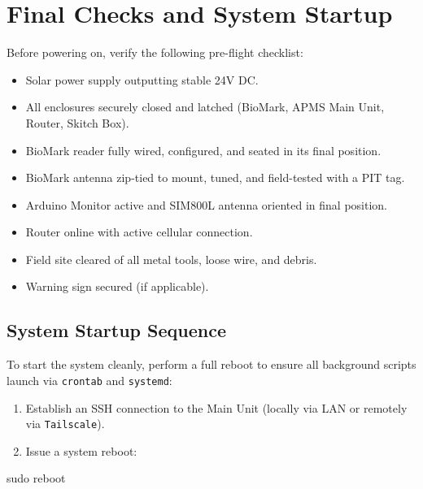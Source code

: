 \documentclass[
  letterpaper,
]{scrbook}
\newenvironment{Shaded}{\begin{snugshade}}{\end{snugshade}}
\newcommand{\FunctionTok}[1]{\textcolor[rgb]{0.28,0.35,0.67}{#1}}
\newcommand{\NormalTok}[1]{\textcolor[rgb]{0.00,0.23,0.31}{#1}}
\providecommand{\tightlist}{%
  \setlength{\itemsep}{0pt}\setlength{\parskip}{0pt}}
\begin{document}
\section{Final Checks and System
Startup}\label{final-checks-and-system-startup}

Before powering on, verify the following pre-flight checklist:

\begin{itemize}
\tightlist
\item[$\square$]
  Solar power supply outputting stable 24V DC.
\item[$\square$]
  All enclosures securely closed and latched (BioMark, APMS Main Unit,
  Router, Skitch Box).
\item[$\square$]
  BioMark reader fully wired, configured, and seated in its final
  position.
\item[$\square$]
  BioMark antenna zip-tied to mount, tuned, and field-tested with a PIT
  tag.
\item[$\square$]
  Arduino Monitor active and SIM800L antenna oriented in final position.
\item[$\square$]
  Router online with active cellular connection.
\item[$\square$]
  Field site cleared of all metal tools, loose wire, and debris.
\item[$\square$]
  Warning sign secured (if applicable).
\end{itemize}

\subsection{System Startup Sequence}\label{system-startup-sequence}

To start the system cleanly, perform a full reboot to ensure all
background scripts launch via \texttt{crontab} and \texttt{systemd}:

\begin{enumerate}
\def\labelenumi{\arabic{enumi}.}
\tightlist
\item
  Establish an SSH connection to the Main Unit (locally via LAN or
  remotely via \texttt{Tailscale}).
\item
  Issue a system reboot:
\end{enumerate}

\begin{Shaded}
\begin{Highlighting}[]
\FunctionTok{sudo}\NormalTok{ reboot}
\end{Highlighting}
\end{Shaded}
\end{document}
